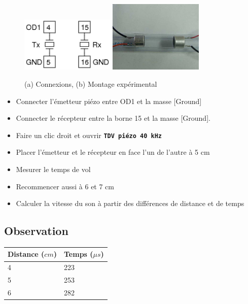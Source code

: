 \documentclass{book}
\newcommand{\nop}{}
\begin{document}
\begin{figure}[h!]
\begin{center}
\caption{\label{fig:Ultrasound}(a) Connexions, (b) Montage expérimental }\vspace{0.5em}
\includegraphics[width=0.4\textwidth, height=0.3\textwidth, keepaspectratio]{Schematic-ultra-sound.png}
\includegraphics[width=0.4\textwidth, height=0.3\textwidth, keepaspectratio]{Pic-40kHz-piezo-photo.png}
\end{center}
\end{figure}



\begin{itemize}
  \item Connecter l'émetteur piézo entre OD1 et la masse [Ground]
  \item Connecter le récepteur entre la borne 15 et la masse [Ground].
  \item Faire un clic droit et ouvrir  \texttt{\textbf{TDV piézo 40 kHz}\nop}
  \item Placer l'émetteur et le récepteur en face l'un de l'autre à 5 cm
  \item Mesurer le temps de vol
  \item Recommencer aussi à 6 et 7 cm
  \item Calculer la vitesse du son à partir des différences de distance et de temps
\end{itemize}

\subsection{Observation}


\begin{tabular}{|l|l|}
\hline
\textbf{Distance ($cm$)}&\textbf{Temps ($\mu s$)}
\\ \hline
4&223
\\ \hline
5&253
\\ \hline
6&282
\\ \hline
\end{tabular}\\[0.5em]
\end{document}
